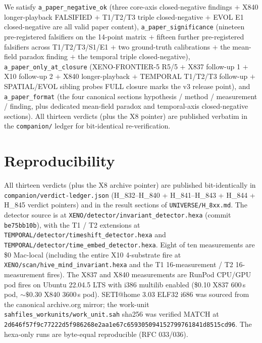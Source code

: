 \documentclass[11pt,a4paper]{article}
\begin{document}
We satisfy \texttt{a\_paper\_negative\_ok} (three core-axis closed-negative
findings $+$ X840 longer-playback FALSIFIED $+$ T1/T2/T3 triple
closed-negative $+$ EVOL E1 closed-negative are all valid paper content),
\texttt{a\_paper\_significance} (nineteen pre-registered falsifiers
on the 14-point matrix $+$ fifteen further pre-registered falsifiers
across T1/T2/T3/S1/E1 $+$ two ground-truth calibrations $+$ the
mean-field paradox finding $+$ the temporal triple closed-negative),
\texttt{a\_paper\_only\_at\_closure} (XENO-FRONTIER-5 R5/5 $+$
X837 follow-up 1 $+$ X10 follow-up 2 $+$ X840 longer-playback $+$
TEMPORAL T1/T2/T3 follow-up $+$ SPATIAL/EVOL sibling probes FULL
closure marks the v3 release point), and \texttt{a\_paper\_format}
(the four canonical sections hypothesis / method / measurement /
finding, plus dedicated mean-field paradox and temporal-axis
closed-negative sections). All thirteen verdicts (plus the X8 pointer)
are published verbatim in the \texttt{companion/} ledger for
bit-identical re-verification.

\section*{Reproducibility}
All thirteen verdicts (plus the X8 archive pointer) are published
bit-identically in \texttt{companion/verdict-ledger.json}
(H\_832--H\_840 + H\_841--H\_843 + H\_844 + H\_845 verdict pointers)
and in the result sections of
\texttt{UNIVERSE/H\_8xx.md}. The detector source is at
\texttt{XENO/detector/invariant\_detector.hexa} (commit
\texttt{be75bb10b}), with the T1 / T2 extensions at
\texttt{TEMPORAL/detector/timeshift\_detector.hexa} and
\texttt{TEMPORAL/detector/time\_embed\_detector.hexa}. Eight of ten
measurements are \$0 Mac-local (including the entire X10
4-substrate fire at \texttt{XENO/scan/hive\_mind\_invariant.hexa}
and the T1 16-measurement / T2 16-measurement fires). The X837 and
X840 measurements are RunPod CPU/GPU pod fires on Ubuntu 22.04.5
LTS with i386 multilib enabled (\$0.10 X837 600\,s pod, $\sim
\$0.30$ X840 3600\,s pod). SETI@home 3.03 ELF32 i686 was sourced
from the canonical archive.org mirror; the work-unit
\texttt{sahfiles\_workunits/work\_unit.sah} sha256 was verified
MATCH at
\texttt{2d646f57f9c77222d5f986268e2aa1e67c659305094152799761841d8515cd96}.
The hexa-only runs are byte-equal reproducible (RFC 033/036).



\end{document}
